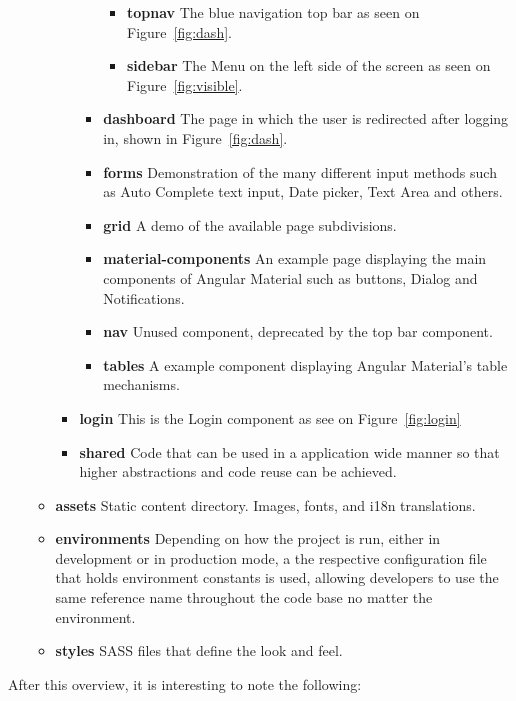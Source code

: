 \begin{itemize}
\begin{itemize}
\begin{itemize}
\begin{itemize}
        \begin{itemize}
        \item \textbf{topnav} The blue navigation top bar as seen on Figure~\ref{fig:dash}.
        \item \textbf{sidebar} The Menu on the left side of the screen as seen on Figure~\ref{fig:visible}.
        \end{itemize}
      \item \textbf{dashboard} The page in which the user is redirected after logging in, shown in Figure~\ref{fig:dash}.
      \item \textbf{forms} Demonstration of the many different input methods such as Auto Complete text input, Date picker, Text Area and others.
      \item \textbf{grid} A demo of the available page subdivisions.
      \item \textbf{material-components} An example page displaying the main components of Angular Material such as buttons, Dialog and Notifications.
      \item \textbf{nav} Unused component, deprecated by the top bar component.
      \item \textbf{tables} A example component displaying Angular Material's table mechanisms.
      \end{itemize}

    \item \textbf{login} This is the Login component as see on Figure~\ref{fig:login}
    \item \textbf{shared} Code that can be used in a application wide manner so that higher abstractions and code reuse can be achieved.
    \end{itemize}
  \item \textbf{assets} Static content directory. Images, fonts, and i18n translations.
  \item \textbf{environments} Depending on how the project is run, either in development or in production mode, a the respective configuration file that holds environment constants is used, allowing developers to use the same reference name throughout the code base no matter the environment.
  \item \textbf{styles} \gls{SASS} files that define the look and feel.
  \end{itemize}
\end{itemize}

After this overview, it is interesting to note the following:


